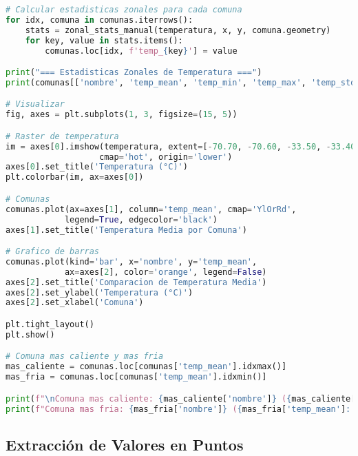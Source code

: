 \documentclass[11pt,a4paper]{article}
\begin{document}
\begin{lstlisting}[language=Python]
# Calcular estadisticas zonales para cada comuna
for idx, comuna in comunas.iterrows():
    stats = zonal_stats_manual(temperatura, x, y, comuna.geometry)
    for key, value in stats.items():
        comunas.loc[idx, f'temp_{key}'] = value

print("=== Estadisticas Zonales de Temperatura ===")
print(comunas[['nombre', 'temp_mean', 'temp_min', 'temp_max', 'temp_std']])

# Visualizar
fig, axes = plt.subplots(1, 3, figsize=(15, 5))

# Raster de temperatura
im = axes[0].imshow(temperatura, extent=[-70.70, -70.60, -33.50, -33.40],
                   cmap='hot', origin='lower')
axes[0].set_title('Temperatura (°C)')
plt.colorbar(im, ax=axes[0])

# Comunas
comunas.plot(ax=axes[1], column='temp_mean', cmap='YlOrRd', 
            legend=True, edgecolor='black')
axes[1].set_title('Temperatura Media por Comuna')

# Grafico de barras
comunas.plot(kind='bar', x='nombre', y='temp_mean', 
            ax=axes[2], color='orange', legend=False)
axes[2].set_title('Comparacion de Temperatura Media')
axes[2].set_ylabel('Temperatura (°C)')
axes[2].set_xlabel('Comuna')

plt.tight_layout()
plt.show()

# Comuna mas caliente y mas fria
mas_caliente = comunas.loc[comunas['temp_mean'].idxmax()]
mas_fria = comunas.loc[comunas['temp_mean'].idxmin()]

print(f"\nComuna mas caliente: {mas_caliente['nombre']} ({mas_caliente['temp_mean']:.1f}°C)")
print(f"Comuna mas fria: {mas_fria['nombre']} ({mas_fria['temp_mean']:.1f}°C)")
\end{lstlisting}

\subsection{Extracción de Valores en Puntos}
\end{document}

